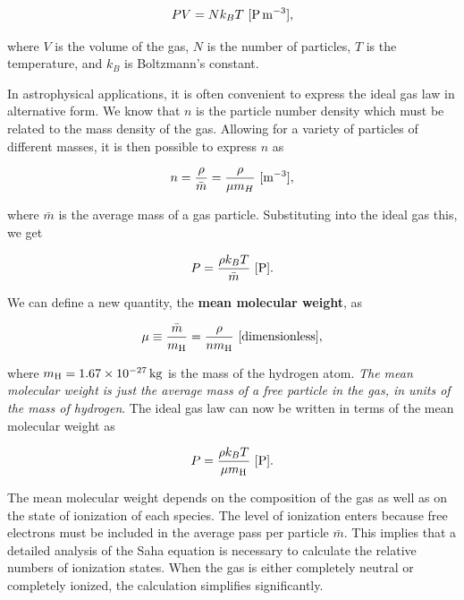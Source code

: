 \documentclass[a4paper,10pt]{article}
\begin{document}
\begin{align*}
    PV = Nk_BT ~ [{\rm P\,m^{-3}}],
\end{align*}

{\noindent}where $V$ is the volume of the gas, $N$ is the number of particles, $T$ is the temperature, and $k_B$ is Boltzmann's constant.

{\noindent}In astrophysical applications, it is often convenient to express the ideal gas law in alternative form. We know that $n$ is the particle number density which must be related to the mass density of the gas. Allowing for a variety of particles of different masses, it is then possible to express $n$ as

\begin{align*}
    n = \frac{\rho}{\bar{m}} = \frac{\rho}{\mu m_H} ~ [{\rm m^{-3}}],
\end{align*}

{\noindent}where $\bar{m}$ is the average mass of a gas particle. Substituting into the ideal gas this, we get

\begin{align*}
    P = \frac{\rho k_BT}{\bar{m}} ~ [{\rm P}].
\end{align*}

{\noindent}We can define a new quantity, the \textbf{mean molecular weight}, as

\begin{align*}
    \mu \equiv \frac{\bar{m}}{m_{\rm H}} = \frac{\rho}{nm_{\rm H}} ~ [{\rm dimensionless}],
\end{align*}

{\noindent}where $m_{\rm H}=1.67\times10^{-27}\,{\rm kg}$ is the mass of the hydrogen atom. \textit{The mean molecular weight is just the average mass of a free particle in the gas, in units of the mass of hydrogen}. The ideal gas law can now be written in terms of the mean molecular weight as

\begin{align*}
    P = \frac{\rho k_BT}{\mu m_{\rm H}} ~ [{\rm P}].
\end{align*}

{\noindent}The mean molecular weight depends on the composition of the gas as well as on the state of ionization of each species. The level of ionization enters because free electrons must be included in the average pass per particle $\bar{m}$. This implies that a detailed analysis of the Saha equation is necessary to calculate the relative numbers of ionization states. When the gas is either completely neutral or completely ionized, the calculation simplifies significantly.
\end{document}

